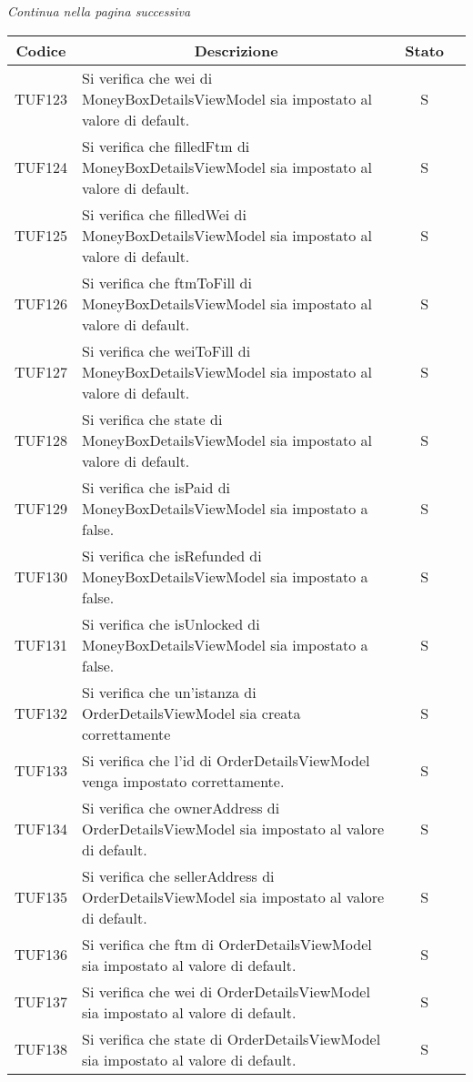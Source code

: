 \begin{center}
  \textit{\small Continua nella pagina successiva}
\end{center}
\begin{table}[H]
  \centering
  \renewcommand{\arraystretch}{1.8}
  \begin{tabular}{c|p{8cm}|c|c}
    \rowcolor[HTML]{125E28}
    \color[HTML]{FFFFFF}\textbf{Codice}
          & \multicolumn{1}{c}{\color[HTML]{FFFFFF}\textbf{Descrizione}}
          & \color[HTML]{FFFFFF}\textbf{Stato}                                                                                                          \\
    \hline
    TUF123 & Si verifica che wei di MoneyBoxDetailsViewModel sia impostato al valore di default. & S \\
    TUF124 & Si verifica che filledFtm di MoneyBoxDetailsViewModel sia impostato al valore di default. & S \\
    TUF125 & Si verifica che filledWei di MoneyBoxDetailsViewModel sia impostato al valore di default. & S \\
    TUF126 & Si verifica che ftmToFill di MoneyBoxDetailsViewModel sia impostato al valore di default. & S \\
    TUF127 & Si verifica che weiToFill di MoneyBoxDetailsViewModel sia impostato al valore di default. & S \\
    TUF128 & Si verifica che state di MoneyBoxDetailsViewModel sia impostato al valore di default. & S \\
    TUF129 & Si verifica che isPaid di MoneyBoxDetailsViewModel sia impostato a false. & S \\
    TUF130 & Si verifica che isRefunded di MoneyBoxDetailsViewModel sia impostato a false. & S \\
    TUF131 & Si verifica che isUnlocked di MoneyBoxDetailsViewModel sia impostato a false. & S \\
    TUF132 & Si verifica che un'istanza di OrderDetailsViewModel sia creata correttamente & S \\
    TUF133 & Si verifica che l'id di OrderDetailsViewModel venga impostato correttamente. & S \\
    TUF134 & Si verifica che ownerAddress di OrderDetailsViewModel sia impostato al valore di default. & S \\
    TUF135 & Si verifica che sellerAddress di OrderDetailsViewModel sia impostato al valore di default. & S \\
    TUF136 & Si verifica che ftm di OrderDetailsViewModel sia impostato al valore di default. & S \\
    TUF137 & Si verifica che wei di OrderDetailsViewModel sia impostato al valore di default. & S \\
    TUF138 & Si verifica che state di OrderDetailsViewModel sia impostato al valore di default. & S \\
  \end{tabular}
\end{table}

